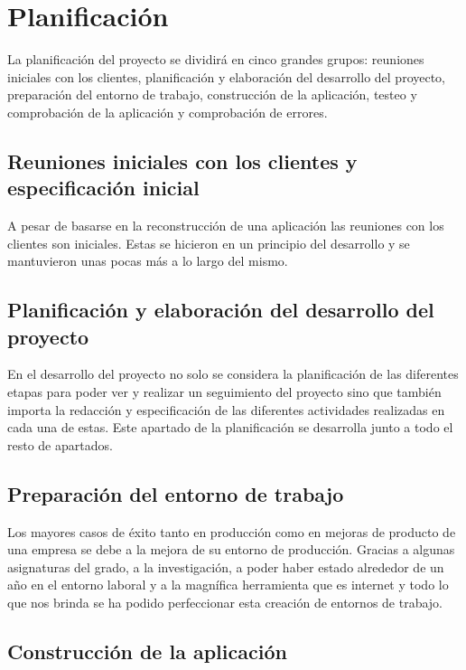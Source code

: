 \section{Planificación}

La planificación del proyecto se dividirá en cinco grandes grupos: reuniones iniciales con los clientes, planificación y elaboración del desarrollo del proyecto, preparación del entorno de trabajo, construcción de la aplicación, testeo y comprobación de la aplicación y comprobación de errores.

\subsection{Reuniones iniciales con los clientes y especificación inicial}

A pesar de basarse en la reconstrucción de una aplicación las reuniones con los clientes son iniciales. Estas se hicieron en un principio del desarrollo y se mantuvieron unas pocas más a lo largo del mismo.

\subsection{Planificación y elaboración del desarrollo del proyecto}

En el desarrollo del proyecto no solo se considera la planificación de las diferentes etapas para poder ver y realizar un seguimiento del proyecto sino que también importa la redacción y especificación de las diferentes actividades realizadas en cada una de estas. Este apartado de la planificación se desarrolla junto a todo el resto de apartados.

\subsection{Preparación del entorno de trabajo}

Los mayores casos de éxito tanto en producción como en mejoras de producto de una empresa se debe a la mejora de su entorno de producción. Gracias a algunas asignaturas del grado, a la investigación, a poder haber estado alrededor de un año en el entorno laboral y a la magnífica herramienta que es internet y todo lo que nos brinda se ha podido perfeccionar esta creación de entornos de trabajo.

\subsection{Construcción de la aplicación}

